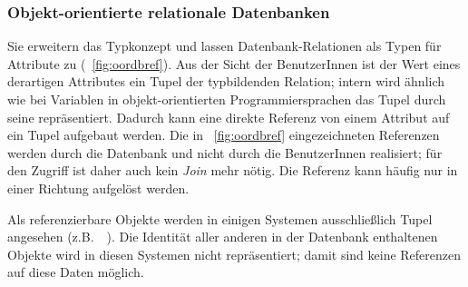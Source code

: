 \subsubsection{Objekt-orientierte relationale Datenbanken}
%
Sie erweitern das Typkonzept und lassen Da\-ten\-bank-Re\-la\-tio\-nen
als Typen f\"{u}r Attribute zu (\figurename~\ref{fig:oordbref}).  Aus der
Sicht der BenutzerInnen ist der Wert eines derartigen Attributes ein
Tupel der typbildenden Relation; intern wird \"{a}hnlich wie bei
Variablen in objekt-orientierten Programmiersprachen das Tupel durch
seine \objid\/ repr\"{a}sentiert.  Dadurch kann eine direkte Referenz von
einem Attribut auf ein Tupel aufgebaut werden. Die in
\figurename~\ref{fig:oordbref} eingezeichneten Referenzen werden durch
die Datenbank und nicht durch die BenutzerInnen realisiert; f\"{u}r den
Zugriff ist daher auch kein {\em Join\/} mehr n\"{o}tig. Die Referenz kann
h\"{a}ufig nur in einer Richtung aufgel\"{o}st werden.
%
\par{}Als referenzierbare Objekte werden in einigen Systemen
ausschlie\ss{}lich Tupel
angesehen (z.B.\ \postgres\ \cite{bib:sto86a}). Die Identit\"{a}t aller
anderen in der Datenbank
enthaltenen Objekte wird in diesen Systemen nicht repr\"{a}sentiert;
damit sind keine Referenzen auf diese Daten m\"{o}glich.
%
